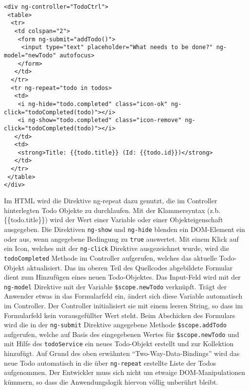 \begin{lstlisting}
<div ng-controller="TodoCtrl">
 <table>
  <tr>
   <td colspan="2">
    <form ng-submit="addTodo()">
     <input type="text" placeholder="What needs to be done?" ng-model="newTodo" autofocus>
    </form>
   </td>
  </tr>
  <tr ng-repeat="todo in todos>
   <td>
    <i ng-hide="todo.completed" class="icon-ok" ng-click="todoCompleted(todo)"></i>
    <i ng-show="todo.completed" class="icon-remove" ng-click="todoCompleted(todo)"></i>
   </td>
   <td>
    <strong>Title: {{todo.title}} (Id: {{todo.id}})</strong>
   </td>
  </tr>
 </table>
</div>
\end{lstlisting}
Im HTML wird die Direktive ng-repeat dazu genutzt, die im Controller hinterlegten Todo Objekte zu durchlaufen. Mit der Klammersyntax (z.b. \{\{todo.title\}\}) wird der Wert einer Variable oder einer Objekteigenschaft ausgegeben. Die Direktiven \texttt{ng-show} und \texttt{ng-hide} blenden ein DOM-Element ein oder aus, wenn angegebene Bedingung zu \texttt{true} auswertet. Mit einem Klick auf ein Icon, welches mit der \texttt{ng-click} Direktive ausgezeichnet wurde, wird die \texttt{todoCompleted} Methode im Controller aufgerufen, welches das aktuelle Todo-Objekt aktualisiert. Das im oberen Teil des Quellcodes abgebildete Formular dient zum Hinzufügen eines neuen Todo-Objektes. Das Input-Feld wird mit der \texttt{ng-model} Direktive mit der Variable \texttt{\$scope.newTodo} verknüpft. Trägt der Anwender etwas in das Formularfeld ein, ändert sich diese Variable automatisch im Controller. Der Controller initialisiert sie mit einem leeren String, so dass im Formularfeld kein vorausgefüllter Wert steht. Beim Abschicken des Formulars wird die in der \texttt{ng-submit} Direktive angegebene Methode \texttt{\$scope.addTodo} aufgerufen, welche auf Basis des eingegebenen Wertes für \texttt{\$scope.newTodo} und mit Hilfe des \texttt{todoService} ein neues Todo-Objekt erstellt und zur Kollektion hinzufügt. Auf Grund des oben erwähnten "`Two-Way-Data-Bindings"' wird das neue Todo automatisch in die über \texttt{ng-repeat} erstellte Liste der Todos aufgenommen. Der Entwickler muss sich nicht um etwaige DOM-Manipulationen kümmern, so dass die Anwendungslogik hiervon völlig unberührt bleibt.


